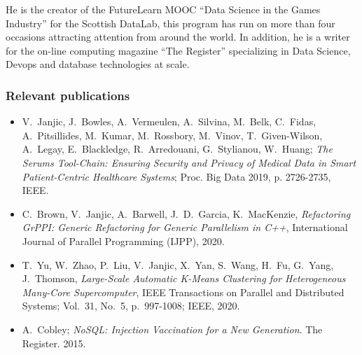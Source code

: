 \documentclass[a4paper,11pt]{article}
\begin{document}
He is the creator of the FutureLearn MOOC “Data Science in the Games Industry” for the Scottish DataLab, this program has run on more than four occasions attracting attention from around the world. In addition, he is a writer for the on-line computing magazine “The Register” specializing in Data Science, Devops and database technologies at scale. 

\pagebreak

\subsubsection*{Relevant publications}
\begin{itemize}
\item V.~Janjic, J.~Bowles, A.~Vermeulen, A.~Silvina, M.~Belk, C.~Fidas, A.~Pitsillides, M.~Kumar, M.~Rossbory, M.~Vinov, T.~Given-Wilson, A.~Legay, E.~Blackledge, R.~Arredouani, G.~Stylianou, W.~Huang; \emph{The Serums Tool-Chain: Ensuring Security and Privacy of Medical Data in Smart Patient-Centric Healthcare Systems}; Proc. Big Data 2019, p. 2726-2735, IEEE.

\item C.~Brown, V.~Janjic, A.~Barwell, J.~D.~Garcia, K.~MacKenzie, \emph{Refactoring GrPPI: Generic Refactoring for Generic Parallelism in C++}, International Journal of Parallel Programming (IJPP), 2020.


\item T.~Yu, W.~Zhao, P.~Liu, V.~Janjic, X.~Yan, S.~Wang, H.~Fu, G.~Yang, J.~Thomson, \emph{Large-Scale Automatic K-Means Clustering for Heterogeneous Many-Core Supercomputer}, IEEE Transactions on Parallel and Distributed Systems; Vol.~31, No.~5, p.~997-1008; IEEE, 2020.

\item
A.~Cobley; \emph{NoSQL: Injection Vaccination for a New Generation}. The Register. 2015.


\end{itemize}
\end{document}
